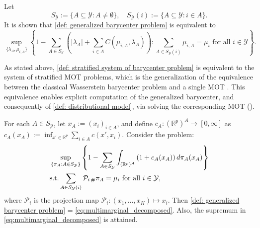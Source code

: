 \documentclass{amsart}
\theoremstyle{plain}
\numberwithin{equation}{section}\newtheorem{theorem}{Theorem}[section]
\theoremstyle{remark}
\begin{document}
Let 
\begin{equation}\label{eq: interaction set}
    S_\mathcal{Y} :=\{A \subseteq \mathcal{Y} : A \neq \emptyset \}, \quad S_\mathcal{Y}(i) :=\{A \subseteq \mathcal{Y} : i \in A \}.
\end{equation}
It is shown that \eqref{def: generalized barycenter problem} is equivalent to
\begin{equation}\label{def: stratified system of barycenter problem}
    \sup_{ \{\lambda_A, \mu_{i,A}\}} \left\{ 1 - \sum_{A \in S_\mathcal{Y}}\left( |\lambda_A| + \sum_{i \in A}C(\mu_{i,A}, \lambda_A) \right)  : \sum_{A \in S_\mathcal{Y}(i)} \mu_{i, A} = \mu_i \text{ for all $i \in \mathcal{Y}$} \right\}.
\end{equation}    







As stated above, \eqref{def: stratified system of barycenter problem} is equivalent to the system of stratified MOT problems, which is the generalization of the equivalence between the classical Wasserstein barycenter problem and a single MOT \cite{Carlier2010MatchingFT, Agueh_Carlier2011, Carlier2015}. This equivalence enables explicit computation of the generalized barycenter, and consequently of \eqref{def: distributional model}, via solving the corresponding MOT (\cite[Propositions 14 and 15]{jakwang_MOT}).







For each $A \in S_\mathcal{Y}$, let $x_A:=(x_i)_{i \in A}$, and define $c_A: (\mathbb{R}^p)^A \to [0,\infty]$ as $c_A(x_A):=\inf_{x' \in \mathbb{R}^p} \sum_{i\in A} c(x', x_i)$. Consider the problem:
\begin{equation}\label{eq:multimarginal_decomposed}
\begin{aligned}
    &\sup_{ \{ \pi_A : A \in S_\mathcal{Y}\} } \left\{ 1 - \sum_{A\in S_\mathcal{Y}} \int_{(\mathbb{R}^p)^A} \left( 1 + c_A(x_A) \right) d\pi_A(x_A) \right\}\\
    &\textup{s.t.} \sum_{A\in S_\mathcal{Y}(i)}\mathcal{P}_{i\,\#}\pi_A=\mu_i  \textup{ for all } i\in \mathcal{Y},
\end{aligned}
\end{equation}
where $\mathcal{P}_i$ is the projection map $\mathcal{P}_i: (x_1, \ldots, x_K)\mapsto x_i$. Then \eqref{def: generalized barycenter problem} = \eqref{eq:multimarginal_decomposed}. Also, the supremum in \eqref{eq:multimarginal_decomposed} is attained.
\end{document}
